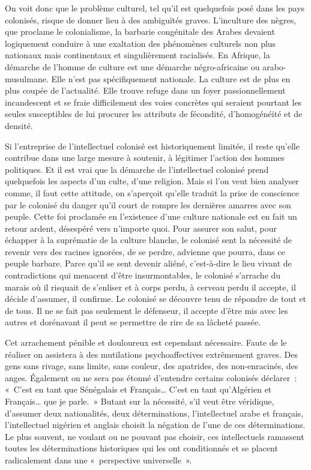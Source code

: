 \documentclass[french,twoside]{book} %
\begin{document}
On voit donc que le problème culturel, tel qu’il est quelquefois posé dans les pays colonisés, risque de donner lieu à des   ambiguïtés graves. L’inculture des nègres, que proclame le colonialisme, la barbarie congénitale des Arabes devaient logiquement conduire à une exaltation des phénomènes culturels non plus nationaux mais continentaux et singulièrement racialisés. En Afrique, la démarche de l’homme de culture est une démarche négro-africaine ou arabo-musulmane. Elle n’est pas spécifiquement nationale. La culture est de plus en plus coupée de l’actualité. Elle trouve refuge dans un foyer passionnellement incandescent et se fraie difficilement des voies concrètes qui seraient pourtant les seules susceptibles de lui procurer les attributs de fécondité, d’homogénéité et de densité.\par
\bigbreak
\noindent Si l’entreprise de l’intellectuel colonisé est historiquement limitée, il reste qu’elle contribue dans une large mesure à soutenir, à légitimer l’action des hommes politiques. Et il est vrai que la démarche de l’intellectuel colonisé prend quelquefois les aspects d’un culte, d’une religion. Mais si l’on veut bien analyser comme, il faut cette attitude, on s’aperçoit qu’elle traduit la prise de conscience par le colonisé du danger qu’il court de rompre les dernières amarres avec son peuple. Cette foi proclamée en l’existence d’une culture nationale est en fait un retour ardent, désespéré vers n’importe quoi. Pour assurer son salut, pour échapper à la suprématie de la culture blanche, le colonisé sent la nécessité de revenir vers des racines ignorées, de se perdre, advienne que pourra, dans ce peuple barbare. Parce qu’il se sent devenir aliéné, c’est-à-dire le lieu vivant de contradictions qui menacent d’être insurmontables, le colonisé s’arrache du marais où il risquait de s’enliser et à corps perdu, à cerveau perdu il accepte, il décide d’assumer, il confirme. Le colonisé se découvre tenu de répondre de tout et de tous. Il ne se fait pas seulement le défenseur, il accepte d’être mis avec les autres et dorénavant il peut se permettre de rire de sa lâcheté passée.\par
\bigbreak
\noindent Cet arrachement pénible et douloureux est cependant nécessaire. Faute de le réaliser on assistera à des mutilations psychoaffectives extrêmement graves. Des gens sans rivage, sans   limite, sans couleur, des apatrides, des non-enracinés, des anges. Également on ne sera pas étonné d’entendre certains colonisés déclarer : « C’est en tant que Sénégalais et Français… C’est en tant qu’Algérien et Français… que je parle. » Butant sur la nécessité, s’il veut être véridique, d’assumer deux nationalités, deux déterminations, l’intellectuel arabe et français, l’intellectuel nigérien et anglais choisit la négation de l’une de ces déterminations. Le plus souvent, ne voulant ou ne pouvant pas choisir, ces intellectuels ramassent toutes les déterminations historiques qui les ont conditionnés et se placent radicalement dans une « perspective universelle ».\par
\end{document}
